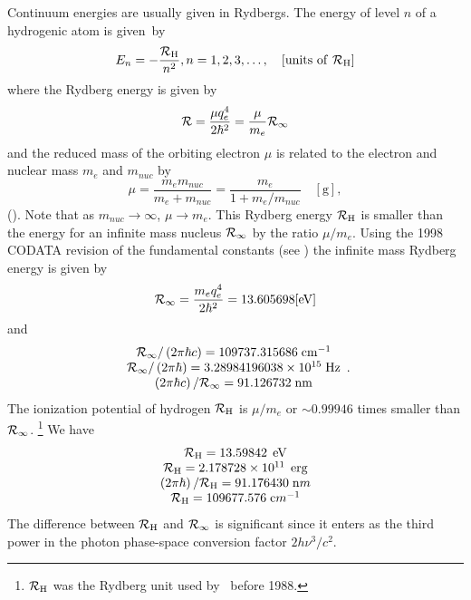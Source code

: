 Continuum energies are usually given in Rydbergs.
The energy of level
$n$ of a hydrogenic atom is given~by
\begin{equation}
{E_n} =  - \frac{{\cal R}_{\mathrm{H}}}{{{n^2}}}, n = 1,2,3,\ldots,\quad [\mathrm{units\ of\
}\mathcal{R}_{\mathrm{H}}]
\end{equation}
where the Rydberg energy is given by
\begin{equation}
{\cal R} = \frac{{\mu q_e^4}}{{2{\hbar ^2}}} = \frac{\mu }{{{m_e}}}{{\cal
R}_\infty }
\end{equation}
and the reduced mass of the orbiting electron $\mu$ is related
to the electron
and nuclear mass $m_e$ and $m_{nuc}$ by
\begin{equation}
\mu  = \frac{{{m_e}{m_{nuc}}}}{{{m_e} + {m_{nuc}}}} = \frac{{{m_e}}}{{1
+ {{{m_e}} /{{m_{nuc}}}}}}\quad  [\mathrm{g}],%
\end{equation}
(\citealp{Friedrich1998}).
Note that as ${m_{nuc}} \to \infty $, $\mu  \to {m_e}$.
This Rydberg energy $\cal{R}_{\mathrm{H}}$ is smaller than
the energy for an infinite mass
nucleus $\cal{R}_\infty$  by the ratio $\mu/m_e$.
Using the 1998 CODATA revision of the
fundamental constants (see \citealp{Cohen1987,Mohr1998}) the
infinite mass Rydberg energy is given by
\begin{equation}
{{\cal R}_\infty } = \frac{{{m_e}q_e^4}}{{2{\hbar ^2}}} = 13.605698
  [\mathrm{eV}]
\end{equation}
and
\begin{equation}
\begin{array}{c}
 {{\cal R}_\infty }/\left( {2\pi \hbar c} \right) =
109737.315686\;{\mathrm{c}}{{\mathrm{m}}^{ - 1}} \\
 {{\cal R}_\infty }/\left( {2\pi \hbar } \right) = 3.28984196038 \times
{10^{15}}\;{\mathrm{Hz}} \\
 \left( {2\pi \hbar c} \right)/{{\cal R}_\infty } = 91.126732\;{\mathrm{nm}} \\
 \end{array}.
\end{equation}
The ionization potential of hydrogen $\cal{R}_{\mathrm{H}}$ is  $\mu/m_e$ or
$\sim 0.99946$ times
smaller than $\cal{R}_\infty$.
\footnote{$\cal{R}_{\mathrm{H}}$ was the Rydberg unit used by \Cloudy\ before 1988.}
We have
\begin{equation}
\begin{array}{c}
{\cal{R}_{\mathrm{H}}} = 13.59842\;{\rm\thinspace eV}\\
{\cal{R}_{\mathrm{H}}} = 2.178728\times 10^{11}\;{\rm\thinspace erg}\\
\left( 2\pi \hbar\right)/{\cal{R}_{\mathrm{H}}} = 91.176430\;{\mathrm nm}\\
{\cal{R}_{\mathrm{H}}} = 109677.576\;{\mathrm cm}^{-1}
\end{array}
\end{equation}
The difference between $\cal{R}_{\mathrm{H}}$ and $\cal{R}_\infty$ is
significant since it enters as the third
power in the photon phase-space conversion factor $2h \nu^3/c^2$.


